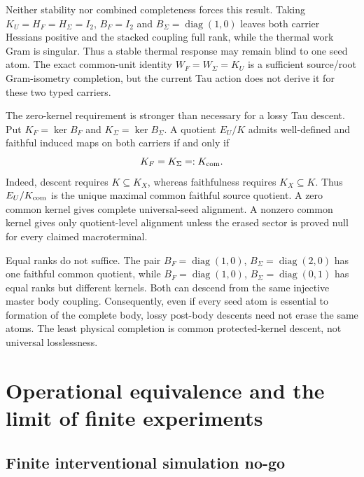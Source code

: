 \documentclass[11pt]{article}
\begin{document}
Neither stability nor combined completeness forces this result.  Taking
$K_U=H_F=H_\Sigma=I_2$, $B_F=I_2$ and
$B_\Sigma=\operatorname{diag}(1,0)$ leaves both carrier Hessians positive and
the stacked coupling full rank, while the thermal work Gram is singular.
Thus a stable thermal response may remain blind to one seed atom.  The exact
common-unit identity $W_F=W_\Sigma=K_U$ is a sufficient source/root
Gram-isometry completion, but the current Tau action does not derive it for
these two typed carriers.

The zero-kernel requirement is stronger than necessary for a lossy Tau
descent.  Put $K_F=\ker B_F$ and $K_\Sigma=\ker B_\Sigma$.  A quotient
$E_U/K$ admits well-defined and faithful induced maps on both carriers if and
only if
\begin{equation}
 K_F=K_\Sigma=:K_{\rm com}.
 \label{eq:common-kernel-descent}
\end{equation}
Indeed, descent requires $K\subseteq K_X$, whereas faithfulness requires
$K_X\subseteq K$.  Thus $E_U/K_{\rm com}$ is the unique maximal common
faithful source quotient.  A zero common kernel gives complete universal-seed
alignment.  A nonzero common kernel gives only quotient-level alignment unless
the erased sector is proved null for every claimed macroterminal.

Equal ranks do not suffice.  The pair
$B_F=\operatorname{diag}(1,0)$,
$B_\Sigma=\operatorname{diag}(2,0)$ has one faithful common quotient, while
$B_F=\operatorname{diag}(1,0)$,
$B_\Sigma=\operatorname{diag}(0,1)$ has equal ranks but different kernels.
Both can descend from the same injective master body coupling.  Consequently,
even if every seed atom is essential to formation of the complete body,
lossy post-body descents need not erase the same atoms.  The least physical
completion is common protected-kernel descent, not universal losslessness.

\section{Operational equivalence and the limit of finite experiments}

\subsection{Finite interventional simulation no-go}
\end{document}
